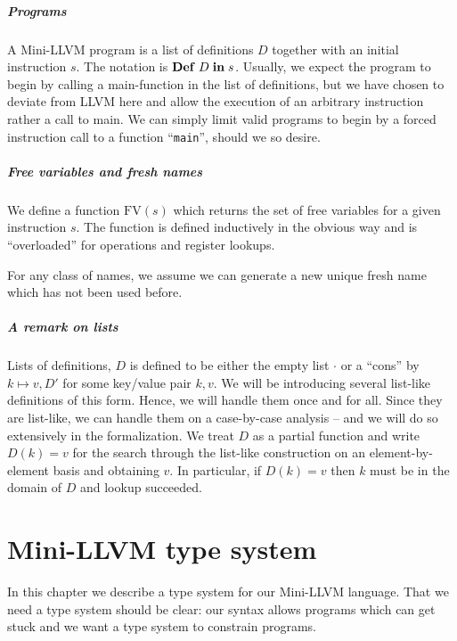 \documentclass[a4paper, oneside, 10pt, draft]{memoir}
\begin{document}
\paragraph{Programs}

A Mini-LLVM program is a list of definitions $D$ together with an
initial instruction $s$. The notation is $\mathbf{Def} \; D \; \mathbf{in} \; s$. Usually, we
expect the program to begin by calling a main-function in the list of
definitions, but we have chosen to deviate from LLVM here and allow
the execution of an arbitrary instruction rather a call to main. We
can simply limit valid programs to begin by a forced instruction
call to a function ``\texttt{main}'', should we so desire.

\paragraph{Free variables and fresh names}
\newcommand{\fv}{\mathrm{FV}}
We define a function $\fv(s)$ which returns the set of free variables
for a given instruction $s$. The function is defined inductively in
the obvious way and is ``overloaded'' for operations and register
lookups.

For any class of names, we assume we can generate a new unique fresh
name which has not been used before.

\paragraph{A remark on lists}

Lists of definitions, $D$ is defined to be either the empty list
$\cdot$ or a ``cons'' by $k \mapsto v,D'$ for some key/value pair
$k,v$. We will be introducing several list-like definitions of this
form. Hence, we will handle them once and for all. Since they are
list-like, we can handle them on a case-by-case analysis -- and we
will do so extensively in the formalization. We treat $D$ as
a partial function and write $D(k) = v$ for the search through the
list-like construction on an element-by-element basis and obtaining
$v$. In particular, if $D(k) = v$ then $k$ must be in the domain of
$D$ and lookup succeeded.

\chapter{Mini-LLVM type system}
\label{chap:type-system}

In this chapter we describe a type system for our Mini-LLVM
language. That we need a type system should be clear: our syntax
allows programs which can get stuck and we want a type system to
constrain programs.
\end{document}
